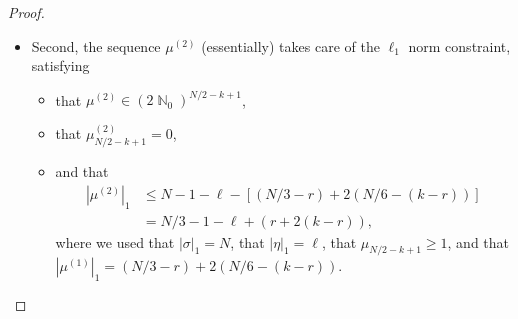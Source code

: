 \documentclass[11pt]{article}
\numberwithin{equation}{section}
\DeclareMathOperator{\N}{\mathbb{N}} %
\theoremstyle{definition}
\begin{document}
\begin{proof}
\begin{itemize}
\item Second, the sequence $\mu^{(2)}$ (essentially) takes care of the $\ell_{1}$ norm constraint, 
satisfying 
\begin{itemize}
    \item that 
$\mu^{(2)} \in (2 \N_0)^{N/2-k+1}$, 
    \item that 
$\mu^{(2)}_{N/2-k+1} = 0$, 
    \item and that 
\begin{align*}
|\mu^{(2)}|_{1} 
&\leq N - 1 - \ell - \left[ (N/3 - r) + 2  (N/6 - (k-r)) \right] \\
&= N/3 - 1 - \ell + (r + 2(k-r)),
\end{align*}
where we used that 
$|\sigma|_{1} = N$, 
that $|\eta|_{1} = \ell$, 
that $\mu_{N/2 - k + 1} \geq 1$, 
and that $|\mu^{(1)}|_{1} = (N/3 - r) + 2(N/6 - (k-r))$.
\end{itemize} 



\end{itemize}
\end{proof}
\end{document}
